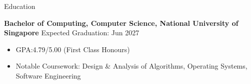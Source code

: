 \documentclass{phanuphat_srisukhawasu_resume} %
\begin{document}

%
%


\begin{rSection}{Education}

  \textbf{Bachelor of Computing, Computer Science, National University of Singapore} \hfill {Expected Graduation: Jun 2027}
  \begin{itemize}
    \item GPA:\@ 4.79/5.00 (First Class Honours)
    \item Notable Coursework: Design \& Analysis of Algorithms, Operating Systems, Software Engineering
  \end{itemize}

\end{rSection}

\end{document}
